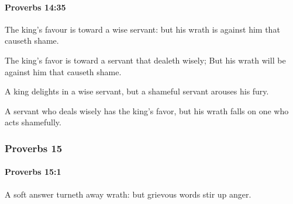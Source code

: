 		\paragraph{Proverbs 14:35} %
			\label{PROVERBS-14-35}

			The king’s favour is toward a wise servant: but his wrath is against him that causeth shame.

			\begin{versebox}
					\item[BHS] 
					\item[ASV] The king's favor is toward a servant that dealeth wisely; But his wrath will be against him that causeth shame.
					\item[NIV] A king delights in a wise servant, but a shameful servant arouses his fury.
					\item[NRSV] A servant who deals wisely has the king’s favor, but his wrath falls on one who acts shamefully.
			\end{versebox}
	\subsubsection{Proverbs 15} %
		\label{PROVERBS-15}

		\paragraph{Proverbs 15:1} %
			\label{PROVERBS-15-1}

			A soft answer turneth away wrath: but grievous words stir up anger.

